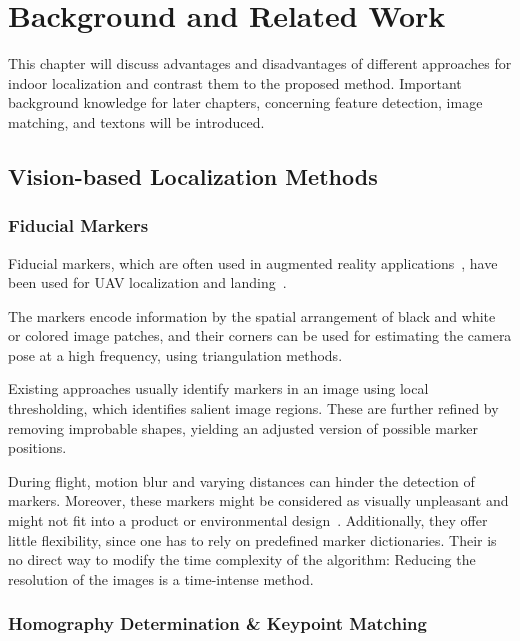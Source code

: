 \chapter{Background and Related Work}
\label{chap:relatedwork}

This chapter will discuss advantages and disadvantages of different approaches for indoor localization and
contrast them to the proposed method. Important
background knowledge for later chapters, concerning feature detection,
image matching, and textons will be introduced.

\section{Vision-based Localization Methods}

\subsection{Fiducial Markers}
\label{sec:fiducialmarkers}

Fiducial markers, which are often used in augmented reality
applications~\cite{kato1999marker,garrido2014automatic}, have been
used for UAV localization and
landing~\cite{eberli2011vision,bebop2015}.

The markers encode information by the spatial arrangement of
black and white or colored image patches, and their corners can be
used for estimating the camera pose at a high frequency, using
triangulation methods.

Existing approaches usually identify markers in
an image using local thresholding, which identifies salient image
regions. These are further refined by removing improbable shapes,
yielding an adjusted version of possible marker positions.

During flight, motion blur and varying distances can hinder the
detection of markers. Moreover, these markers might be considered as
visually unpleasant and might not fit into a product or environmental
design~\cite{chu2013halftone}. Additionally, they offer little
flexibility, since one has to rely on predefined marker dictionaries.
Their is no direct way to modify the time complexity of the algorithm:
Reducing the resolution of the images is a time-intense method.

\subsection{Homography Determination \& Keypoint Matching}
\label{sec:keypointmatching}

